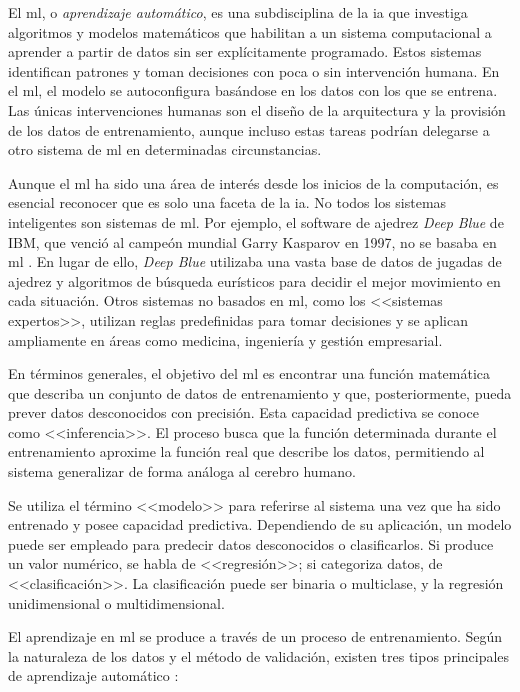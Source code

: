 El \gls{ml}, o \textit{aprendizaje automático}, es una subdisciplina de la \gls{ia} que investiga algoritmos y modelos matemáticos que habilitan a un sistema computacional a aprender a partir de datos sin ser explícitamente programado. Estos sistemas identifican patrones y toman decisiones con poca o sin intervención humana. En el \gls{ml}, el modelo se autoconfigura basándose en los datos con los que se entrena. Las únicas intervenciones humanas son el diseño de la arquitectura y la provisión de los datos de entrenamiento, aunque incluso estas tareas podrían delegarse a otro sistema de \gls{ml} en determinadas circunstancias.

Aunque el \gls{ml} ha sido una área de interés desde los inicios de la computación, es esencial reconocer que es solo una faceta de la \gls{ia}. No todos los sistemas inteligentes son sistemas de \gls{ml}. Por ejemplo, el software de ajedrez \textit{Deep Blue} de IBM, que venció al campeón mundial Garry Kasparov en 1997, no se basaba en \gls{ml} \citep{campbellDeepBlue2002}. En lugar de ello, \textit{Deep Blue} utilizaba una vasta base de datos de jugadas de ajedrez y algoritmos de búsqueda eurísticos para decidir el mejor movimiento en cada situación. Otros sistemas no basados en \gls{ml}, como los <<sistemas expertos>>, utilizan reglas predefinidas para tomar decisiones y se aplican ampliamente en áreas como medicina, ingeniería y gestión empresarial.

En términos generales, el objetivo del \gls{ml} es encontrar una función matemática que describa un conjunto de datos de entrenamiento y que, posteriormente, pueda prever datos desconocidos con precisión. Esta capacidad predictiva se conoce como <<inferencia>>. El proceso busca que la función determinada durante el entrenamiento aproxime la función real que describe los datos, permitiendo al sistema generalizar de forma análoga al cerebro humano.

Se utiliza el término <<modelo>> para referirse al sistema una vez que ha sido entrenado y posee capacidad predictiva. Dependiendo de su aplicación, un modelo puede ser empleado para predecir datos desconocidos o clasificarlos. Si produce un valor numérico, se habla de <<regresión>>; si categoriza datos, de <<clasificación>>. La clasificación puede ser binaria o multiclase, y la regresión unidimensional o multidimensional.

El aprendizaje en \gls{ml} se produce a través de un proceso de entrenamiento. Según la naturaleza de los datos y el método de validación, existen tres tipos principales de aprendizaje automático \citep[p. ~38]{torresivinalsPythonDeepLearning2020}:

